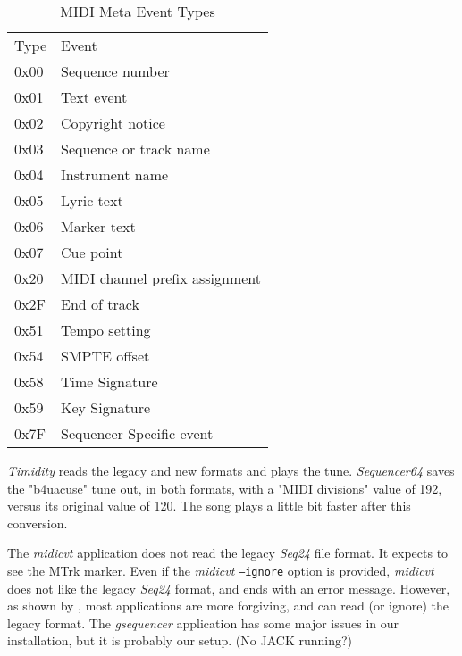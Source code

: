    \begin{table}
      \centering
      \caption{MIDI Meta Event Types}
      \label{table:midi_meta_event_types}
      \begin{tabular}{l l}
         Type	& Event \\
         0x00	& Sequence number \\
         0x01	& Text event \\
         0x02	& Copyright notice \\
         0x03	& Sequence or track name \\
         0x04	& Instrument name \\
         0x05	& Lyric text \\
         0x06	& Marker text \\
         0x07	& Cue point \\
         0x20	& MIDI channel prefix assignment \\
         0x2F	& End of track \\
         0x51	& Tempo setting \\
         0x54	& SMPTE offset \\
         0x58	& Time Signature \\
         0x59	& Key Signature \\
         0x7F	& Sequencer-Specific event \\
      \end{tabular}
   \end{table}

   \textsl{Timidity} reads the legacy and new formats and plays the tune.
   \textsl{Sequencer64}  saves the "b4uacuse" tune out, in both formats,
   with a "MIDI divisions" value of 192, versus its original value of 120.
   The song plays a little bit faster after this conversion.

   The \textsl{midicvt} application does not read the legacy \textsl{Seq24}
   file format.  It
   expects to see the MTrk marker.  Even if the \textsl{midicvt}
   \texttt{--ignore} option is provided,
   \textsl{midicvt} does not like the legacy \textsl{Seq24} format, and ends
   with an error message.
   However, as shown by ,
   most applications are more
   forgiving, and can read (or ignore) the legacy format.  The
   \textsl{gsequencer} application has some major issues in our
   installation, but it is probably our setup.  (No JACK running?)

